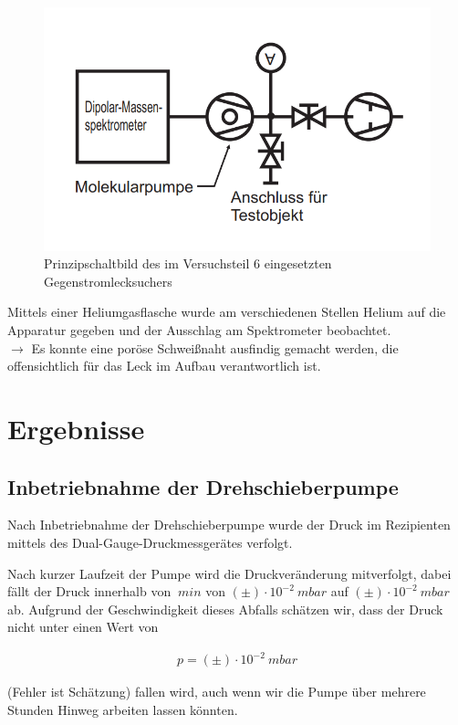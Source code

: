 \documentclass[12pt, a4paper]{scrartcl}
\begin{document}
		\begin{figure}[H]
			\centering
			\includegraphics[width=.3\paperwidth]{aufbau262}
			\caption{Prinzipschaltbild des im Versuchsteil 6 eingesetzten Gegenstromlecksuchers}
			\label{fig:anord6}
		\end{figure}
		Mittels einer Heliumgasflasche wurde am verschiedenen Stellen Helium auf die Apparatur gegeben und der Ausschlag am Spektrometer beobachtet.\\
		$\rightarrow$ Es konnte eine poröse Schweißnaht ausfindig gemacht werden, die offensichtlich für das Leck im Aufbau verantwortlich ist.

	\section{Ergebnisse}
	\subsection{Inbetriebnahme der Drehschieberpumpe}
	
		Nach Inbetriebnahme der Drehschieberpumpe wurde der Druck im Rezipienten mittels des Dual-Gauge-Druckmessgerätes verfolgt.
		
		Nach kurzer Laufzeit der Pumpe wird die Druckveränderung mitverfolgt, dabei fällt der Druck innerhalb von $\ min$ von $(\pm)\cdot 10^{-2}\ mbar$ auf $(\pm)\cdot 10^{-2}\ mbar$ ab. Aufgrund der Geschwindigkeit dieses Abfalls schätzen wir, dass der Druck nicht unter einen Wert von
		
		\begin{align}
			p=(\pm)\cdot 10^{-2}\ mbar
		\end{align}
		
		(Fehler ist Schätzung) fallen wird, auch wenn wir die Pumpe über mehrere Stunden Hinweg arbeiten lassen könnten.
		
\end{document}
